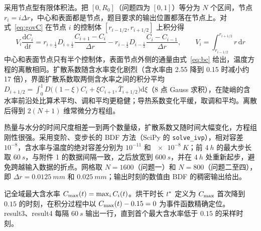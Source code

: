  采用节点型有限体积法\cite{patankar}。把 $[0,R_0]$（问题四为 $[0,1]$）等分为 $N$ 个区间，节点 $r_i=i\Delta r$，中心和表面都是节点，题目要求的输出位置都落在节点上。对式~\eqref{eq:govC} 在节点 $i$ 的控制体 $[r_{i-1/2},r_{i+1/2}]$ 上积分得
\begin{equation}
V_i\frac{\mathrm{d}C_i}{\mathrm{d}t}=r_{i+\frac12}D_{i+\frac12}\frac{C_{i+1}-C_i}{\Delta r}-r_{i-\frac12}D_{i-\frac12}\frac{C_i-C_{i-1}}{\Delta r},\qquad V_i=\int_{r_{i-1/2}}^{r_{i+1/2}}r\,\mathrm{d}r
\label{eq:fvm}
\end{equation}
中心和表面节点只有半个控制体，表面节点外侧的通量由式~\eqref{eq:bc} 给出，温度方程的离散相同。扩散系数随含水率变化剧烈（含水率由 2.55 降到 0.15 时减小约 17 倍），界面扩散系数取两侧含水率之间的积分平均 $D_{i+1/2}=\int_0^1D\big((1-\xi)C_i+\xi C_{i+1},\bar T_{i+1/2}\big)\mathrm{d}\xi$（8 点 Gauss 求积），在陡峭的含水率前沿处比算术平均、调和平均更稳健\cite{maddix}；导热系数变化平缓，取调和平均\cite{patankar}。离散后得到 $2(N+1)$ 维常微分方程组。

 热量与水分的时间尺度相差一到两个数量级，扩散系数又随时间大幅变化，方程组刚性很强。采用变阶、变步长的 BDF 方法\cite{shampine}（SciPy 的 \texttt{solve\_ivp}\cite{scipy}），相对容差 $10^{-8}$，含水率与温度的绝对容差分别为 $10^{-11}$ 和 $\SI{e-8}{K}$；前 $\SI{4}{h}$ 的最大步长取 $\SI{60}{s}$，与附件 1 的数据间隔一致，之后放宽到 $\SI{600}{s}$，并在 $\SI{4}{h}$ 处重新起步，避免跨越输入数据的折点。网格取 $N=1600$（问题一）和 $N=800$（问题二至四），即 $\Delta r=\SI{0.0125}{mm}$ 和 $\SI{0.025}{mm}$；输出时刻的数值由 BDF 的稠密输出给出。

 记全域最大含水率 $C_{\max}(t)=\max_iC_i(t)$。烘干时长 $t^{*}$ 定义为 $C_{\max}$ 首次降到 $0.15$ 的时刻，在积分过程中以 $C_{\max}(t)-0.15=0$ 为事件函数精确定位。result3、result4 每隔 $\SI{60}{s}$ 输出一行，直到首个最大含水率低于 $0.15$ 的采样时刻。
